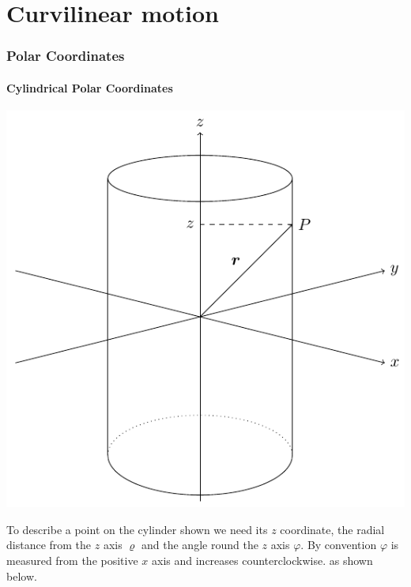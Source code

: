 \documentclass{article}
\begin{document}
\part{Curvilinear motion}
\section{Polar Coordinates}

\subsection*{Cylindrical Polar Coordinates}

\begin{center}
\includegraphics[scale=0.4]{CylindricalPolarCoordinates}
\end{center}
To describe a point on the cylinder shown we need its \(z\) coordinate, the radial distance from the \(z\) axis \(\varrho\) and the angle round the \(z\) axis \(\varphi\). By convention \(\varphi\) is measured from the positive \(x\) axis and increases counterclockwise. as shown below.
\end{document}
